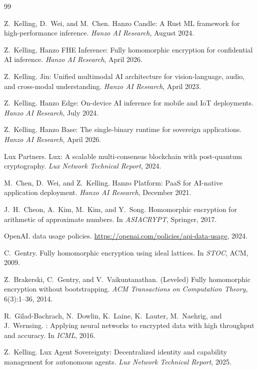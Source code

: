 \documentclass[11pt]{article}
\begin{document}
\begin{thebibliography}{99}

Z.~Kelling, D.~Wei, and M.~Chen.
\newblock Hanzo Candle: A {Rust} {ML} framework for high-performance inference.
\newblock \emph{Hanzo AI Research}, August 2024.

Z.~Kelling.
\newblock Hanzo {FHE} Inference: Fully homomorphic encryption for confidential
{AI} inference.
\newblock \emph{Hanzo AI Research}, April 2026.

Z.~Kelling.
\newblock Jin: Unified multimodal {AI} architecture for vision-language, audio,
and cross-modal understanding.
\newblock \emph{Hanzo AI Research}, April 2023.

Z.~Kelling.
\newblock Hanzo Edge: On-device {AI} inference for mobile and {IoT} deployments.
\newblock \emph{Hanzo AI Research}, July 2024.

Z.~Kelling.
\newblock Hanzo Base: The single-binary runtime for sovereign applications.
\newblock \emph{Hanzo AI Research}, April 2026.

{Lux Partners}.
\newblock Lux: A scalable multi-consensus blockchain with post-quantum
cryptography.
\newblock \emph{Lux Network Technical Report}, 2024.

M.~Chen, D.~Wei, and Z.~Kelling.
\newblock Hanzo Platform: {PaaS} for {AI}-native application deployment.
\newblock \emph{Hanzo AI Research}, December 2021.

J.~H.~Cheon, A.~Kim, M.~Kim, and Y.~Song.
\newblock Homomorphic encryption for arithmetic of approximate numbers.
\newblock In \emph{ASIACRYPT}, Springer, 2017.

{OpenAI}.
 data usage policies.
\newblock \url{https://openai.com/policies/api-data-usage}, 2024.

C.~Gentry.
\newblock Fully homomorphic encryption using ideal lattices.
\newblock In \emph{STOC}, ACM, 2009.

Z.~Brakerski, C.~Gentry, and V.~Vaikuntanathan.
\newblock ({Leveled}) Fully homomorphic encryption without bootstrapping.
\newblock \emph{ACM Transactions on Computation Theory}, 6(3):1--36, 2014.

R.~Gilad-Bachrach, N.~Dowlin, K.~Laine, K.~Lauter, M.~Naehrig, and
J.~Wernsing.
: Applying neural networks to encrypted data with high
throughput and accuracy.
\newblock In \emph{ICML}, 2016.

Z.~Kelling.
\newblock Lux Agent Sovereignty: Decentralized identity and capability
management for autonomous agents.
\newblock \emph{Lux Network Technical Report}, 2025.

\end{thebibliography}
\end{document}
